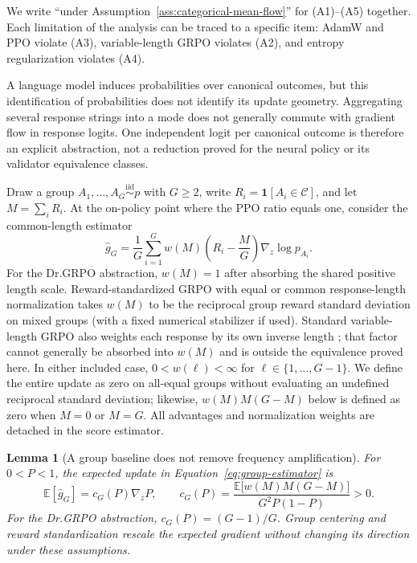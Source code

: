 \documentclass{article}
\newcommand{\1}{\mathbf 1}
\newcommand{\E}{\mathbb E}
\newtheorem{lemma}{Lemma}[section]
\theoremstyle{remark}
\theoremstyle{definition}
\theoremstyle{plain}
\begin{document}
We write ``under Assumption~\ref{ass:categorical-mean-flow}'' for (A1)--(A5)
together. Each limitation of the analysis can be traced to a specific item:
AdamW and PPO violate (A3), variable-length GRPO violates (A2), and entropy
regularization violates (A4).

A language model induces probabilities over canonical outcomes, but this
identification of probabilities does not identify its update geometry.
Aggregating several response strings into a mode does not generally commute
with gradient flow in response logits. One independent logit per canonical
outcome is therefore an explicit abstraction, not a reduction proved for the
neural policy or its validator equivalence classes.

Draw a group $A_1,\ldots,A_G\stackrel{\mathrm{iid}}{\sim}p$ with $G\ge2$,
write $R_i=\1[A_i\in\mathcal C]$, and let $M=\sum_iR_i$. At the on-policy
point where the PPO ratio equals one, consider the common-length estimator
\begin{equation}
  \widehat g_G
  =\frac1G\sum_{i=1}^G
   w(M)\left(R_i-\frac{M}{G}\right)\nabla_z\log p_{A_i}.
  \label{eq:group-estimator}
\end{equation}
For the Dr.GRPO abstraction, $w(M)=1$ after absorbing the shared positive
length scale. Reward-standardized GRPO with equal or common response-length
normalization takes $w(M)$ to be the reciprocal group reward standard
deviation on mixed groups (with a fixed numerical stabilizer if used).
Standard variable-length GRPO also weights each response by its own inverse
length \citep{shao2024deepseekmath,liu2025understanding}; that factor cannot
generally be absorbed into $w(M)$ and is outside the equivalence proved here.
In either included case, $0<w(\ell)<\infty$ for
$\ell\in\{1,\ldots,G-1\}$. We define the entire update as zero on all-equal
groups without evaluating an undefined reciprocal standard deviation;
likewise, $w(M)M(G-M)$ below is defined as zero when $M=0$ or $M=G$. All
advantages and normalization weights are detached in the score estimator.

\begin{lemma}[A group baseline does not remove frequency amplification]
\label{lem:grpo-mean}
For $0<P<1$, the expected update in Equation~\eqref{eq:group-estimator} is
\begin{equation}
  \E[\widehat g_G]
  =c_G(P)\nabla_z P,
  \qquad
  c_G(P)=
  \frac{\E\!\big[w(M)M(G-M)\big]}{G^2P(1-P)}>0.
  \label{eq:expected-group-gradient}
\end{equation}
For the Dr.GRPO abstraction, $c_G(P)=(G-1)/G$. Group centering and reward
standardization rescale the expected gradient without changing its direction
under these assumptions.
\end{lemma}
\end{document}
